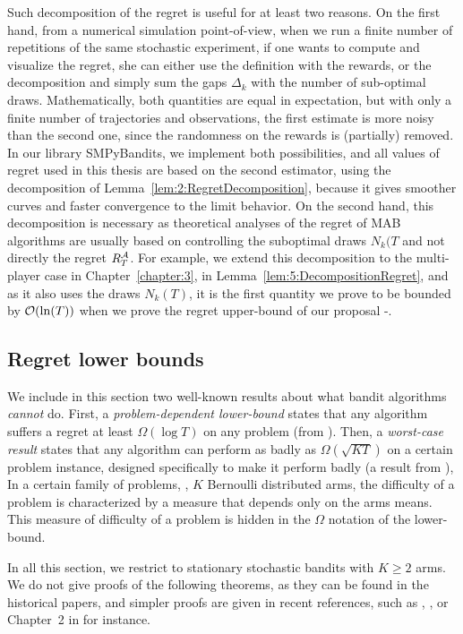 Such decomposition of the regret is useful for at least two reasons.
%
On the first hand, from a numerical simulation point-of-view, when we run a finite number of repetitions of the same stochastic experiment, if one wants to compute and visualize the regret, she can either use the definition with the rewards, or the decomposition and simply sum the gaps $\Delta_k$ with the number of sub-optimal draws.
Mathematically, both quantities are equal in expectation, but with only a finite number of trajectories and observations, the first estimate is more noisy than the second one, since the randomness on the rewards is (partially) removed.
In our library SMPyBandits, we implement both possibilities, and all values of regret used in this thesis are based on the second estimator, using the decomposition of Lemma~\ref{lem:2:RegretDecomposition}, because it gives smoother curves and faster convergence to the limit behavior.
%
On the second hand, this decomposition is necessary as theoretical analyses of the regret of MAB algorithms are usually based on controlling the suboptimal draws $N_k(T$ and not directly the regret $R_T^{\mathcal{A}}$.
For example, we extend this decomposition to the multi-player case in Chapter~\ref{chapter:3}, in Lemma~\ref{lem:5:DecompositionRegret}, and as it also uses the draws $N_k(T)$, it is the first quantity we prove to be bounded by $\mathop{}\mathopen{}\mathcal{O}\mathopen{}\left(\ln(T)\right)$ when we prove the regret upper-bound of our proposal \MCTopM-\klUCB.


\subsection{Regret lower bounds}

We include in this section two well-known results about what bandit algorithms \emph{cannot} do.
First, a \emph{problem-dependent lower-bound} states that any algorithm suffers a regret at least $\Omega(\log T)$ on any problem (from \cite{LaiRobbins85}).
Then, a \emph{worst-case result} states that any algorithm can perform as badly as $\Omega(\sqrt{K T})$ on a certain problem instance, designed specifically to make it perform badly (a result from \cite{Auer02NonStochastic}),
%
In a certain family of problems, \eg, $K$ Bernoulli distributed arms, the difficulty of a problem is characterized by a measure that depends only on the arms means. This measure of difficulty of a problem is hidden in the $\Omega$ notation of the lower-bound.

In all this section, we restrict to stationary stochastic bandits with $K\geq2$ arms.
We do not give proofs of the following theorems, as they can be found in the historical papers, and simpler proofs are given in recent references, such as \cite{Bubeck12}, \cite{LattimoreBanditAlgorithmsBook}, or Chapter~2 in \cite{Slivkins2019} for instance.

